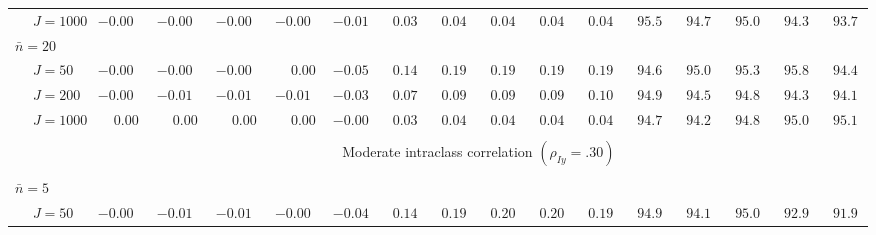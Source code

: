 \begin{sidewaystable}
\begin{threeparttable}
\begin{tabular}{llccccccccccccccc}
 & \nopagebreak $\;J=1000$  & ${-}0.00\phantom{0}$ & ${-}0.00\phantom{0}$ & ${-}0.00\phantom{0}$ & ${-}0.00\phantom{0}$ & ${-}0.01\phantom{0}$ & $\phantom{0}0.03\phantom{0}$ & $\phantom{0}0.04\phantom{0}$ & $\phantom{0}0.04\phantom{0}$ & $\phantom{0}0.04\phantom{0}$ & $\phantom{0}0.04\phantom{0}$ & $\phantom{0}95.5\phantom{0}$ & $\phantom{0}94.7\phantom{0}$ & $\phantom{0}95.0\phantom{0}$ & $\phantom{0}94.3\phantom{0}$ & $\phantom{0}93.7\phantom{0}$ \\
\multicolumn{4}{l}{$\bar{n}=20$} \\  & \nopagebreak $\;J=50$  & ${-}0.00\phantom{0}$ & ${-}0.00\phantom{0}$ & ${-}0.00\phantom{0}$ & $\phantom{-}0.00\phantom{0}$ & ${-}0.05\phantom{0}$ & $\phantom{0}0.14\phantom{0}$ & $\phantom{0}0.19\phantom{0}$ & $\phantom{0}0.19\phantom{0}$ & $\phantom{0}0.19\phantom{0}$ & $\phantom{0}0.19\phantom{0}$ & $\phantom{0}94.6\phantom{0}$ & $\phantom{0}95.0\phantom{0}$ & $\phantom{0}95.3\phantom{0}$ & $\phantom{0}95.8\phantom{0}$ & $\phantom{0}94.4\phantom{0}$ \\
 & \nopagebreak $\;J=200$  & ${-}0.00\phantom{0}$ & ${-}0.01\phantom{0}$ & ${-}0.01\phantom{0}$ & ${-}0.01\phantom{0}$ & ${-}0.03\phantom{0}$ & $\phantom{0}0.07\phantom{0}$ & $\phantom{0}0.09\phantom{0}$ & $\phantom{0}0.09\phantom{0}$ & $\phantom{0}0.09\phantom{0}$ & $\phantom{0}0.10\phantom{0}$ & $\phantom{0}94.9\phantom{0}$ & $\phantom{0}94.5\phantom{0}$ & $\phantom{0}94.8\phantom{0}$ & $\phantom{0}94.3\phantom{0}$ & $\phantom{0}94.1\phantom{0}$ \\
 & \nopagebreak $\;J=1000$  & $\phantom{-}0.00\phantom{0}$ & $\phantom{-}0.00\phantom{0}$ & $\phantom{-}0.00\phantom{0}$ & $\phantom{-}0.00\phantom{0}$ & ${-}0.00\phantom{0}$ & $\phantom{0}0.03\phantom{0}$ & $\phantom{0}0.04\phantom{0}$ & $\phantom{0}0.04\phantom{0}$ & $\phantom{0}0.04\phantom{0}$ & $\phantom{0}0.04\phantom{0}$ & $\phantom{0}94.7\phantom{0}$ & $\phantom{0}94.2\phantom{0}$ & $\phantom{0}94.8\phantom{0}$ & $\phantom{0}95.0\phantom{0}$ & $\phantom{0}95.1\phantom{0}$ \\
[0.5ex]\hline\\[-1.6ex] 
& & \multicolumn{15}{c}{Moderate intraclass correlation $(\rho_{Iy}=.30)$} \\[0.6ex]\hline\\[-1.8ex]
\multicolumn{4}{l}{$\bar{n}=5$} \\  & \nopagebreak $\;J=50$  & ${-}0.00\phantom{0}$ & ${-}0.01\phantom{0}$ & ${-}0.01\phantom{0}$ & ${-}0.00\phantom{0}$ & ${-}0.04\phantom{0}$ & $\phantom{0}0.14\phantom{0}$ & $\phantom{0}0.19\phantom{0}$ & $\phantom{0}0.20\phantom{0}$ & $\phantom{0}0.20\phantom{0}$ & $\phantom{0}0.19\phantom{0}$ & $\phantom{0}94.9\phantom{0}$ & $\phantom{0}94.1\phantom{0}$ & $\phantom{0}95.0\phantom{0}$ & $\phantom{0}92.9\phantom{0}$ & $\phantom{0}91.9\phantom{0}$ \\

\end{tabular}
\end{threeparttable}
\end{sidewaystable}
